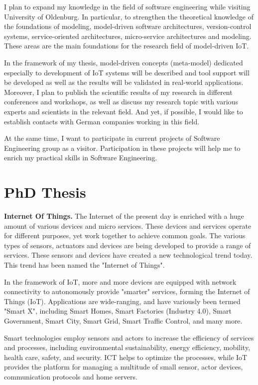 \documentclass[10pt, oneside]{article}
\begin{document}
I plan to expand my knowledge in the field of software engineering while visiting University of Oldenburg. In particular, to strengthen the theoretical knowledge of the foundations of modeling, model-driven software architectures, version-control systems, service-oriented architectures, micro-service architectures and modeling. These areas are the main foundations for the research field of model-driven IoT. 

In the framework of my thesis, model-driven concepts (meta-model) dedicated especially to development of IoT systems will be described and tool support will be developed as well as the results will be validated in real-world applications. Moreover, I plan to publish the scientific results of my research in different conferences and workshops, as well as discuss my research topic with various experts and scientists in the relevant field. And yet, if possible, I would like to establish contacts with German companies working in this field.

At the same time, I want to participate in current projects of Software Engineering group as a visitor. Participation in these projects will help me to enrich my practical skills in Software Engineering.

\section{PhD Thesis}
\textbf{Internet Of Things.} The Internet of the present day is enriched with a huge amount of various devices and micro services. These devices and services operate for different purposes, yet work together to achieve common goals. The various types of sensors, actuators and devices are being developed to provide a range of services. These sensors and devices have created a new technological trend today. This trend has been named the "Internet of Things". 

In the framework of IoT, more and more devices are equipped with network connectivity to autonomously provide "smarter" services, forming the Internet of Things (IoT). Applications are wide-ranging, and have variously been termed "Smart X", including Smart Homes, Smart Factories (Industry 4.0), Smart Government, Smart City, Smart Grid, Smart Traffic Control, and many more.

Smart technologies employ sensors and actors to increase the efficiency of services and processes, including environmental sustainability, energy efficiency, mobility, health care, safety, and security. ICT helps to optimize the processes, while IoT provides the platform for managing a multitude of small sensor, actor devices, communication protocols and home servers.
\end{document}
